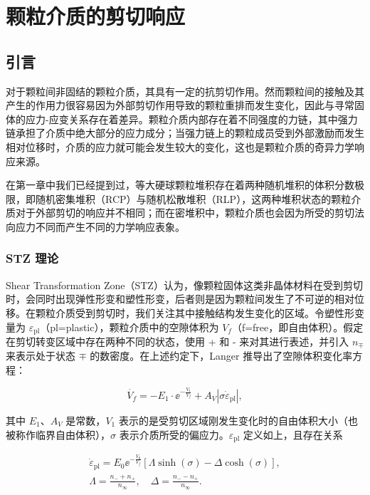 
\chapter{颗粒介质的剪切响应}

\section{引言}

对于颗粒间非固结的颗粒介质，其具有一定的抗剪切作用。然而颗粒间的接触及其产生的作用力很容易因为外部剪切作用导致的颗粒重排而发生变化，因此与寻常固体的应力-应变关系存在着差异。颗粒介质内部存在着不同强度的力链，其中强力链承担了介质中绝大部分的应力成分；当强力链上的颗粒成员受到外部激励而发生相对位移时，介质的应力就可能会发生较大的变化，这也是颗粒介质的奇异力学响应来源。

在第一章中我们已经提到过，等大硬球颗粒堆积存在着两种随机堆积的体积分数极限，即随机密集堆积（RCP）与随机松散堆积（RLP），这两种堆积状态的颗粒介质对于外部剪切的响应并不相同；而在密堆积中，颗粒介质也会因为所受的剪切法向应力不同而产生不同的力学响应表象。


\subsection{STZ 理论}

Shear Transformation Zone（STZ）认为，像颗粒固体这类非晶体材料在受到剪切时，会同时出现弹性形变和塑性形变，后者则是因为颗粒间发生了不可逆的相对位移。在颗粒介质受到剪切时，我们关注其中接触结构发生变化的区域。令塑性形变量为 $\varepsilon_{\text{pl}}$（pl=plastic），颗粒介质中的空隙体积为 $V_{f}$（f=free，即自由体积）。假定在剪切转变区域中存在两种不同的状态，使用 + 和 - 来对其进行表述，并引入 $n_{\mp}$ 来表示处于状态 $\mp$ 的数密度。在上述约定下，Langer 推导出了空隙体积变化率方程\cite{PhysRevE.64.011504}：

\begin{equation}
  \dot{V_{f}} = -E_{1}\cdot{\ee}^{-\frac{V_{1}}{V_{f}}} + A_{V}|\sigma\dot{\varepsilon}_{\text{pl}}|,
\end{equation}

其中 $E_{1}$、$A_{V}$ 是常数，$V_{1}$ 表示的是受剪切区域刚发生变化时的自由体积大小（也被称作临界自由体积），$\sigma$ 表示介质所受的偏应力。$\varepsilon_{\text{pl}}$ 定义如上，且存在关系

\begin{align}
  \dot{\varepsilon}_{\text{pl}} = E_{0}{\ee}^{-\frac{V_{0}}{V_{f}}}\left[\Lambda\sinh{(\sigma)} - \Delta\cosh{(\sigma)}\right],\\
  \Lambda = \frac{n_{-} + n_{+}}{n_{\infty}},\quad\Delta = \frac{n_{-} - n_{+}}{n_{\infty}}.
\end{align}

